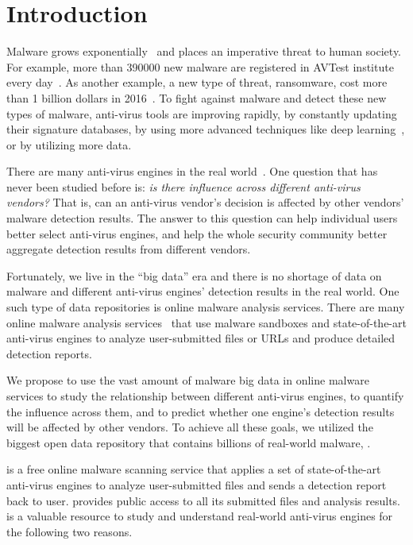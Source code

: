 \section{Introduction}
\label{sec:intro}

Malware grows exponentially~\cite{avtest} and places an imperative threat to human society. 
For example, more than 390000 new malware are registered in AVTest institute every day~\cite{avtest}.
As another example, a new type of threat, ransomware, cost more than 1 billion dollars in 2016~\cite{ransomware}. 
To fight against malware and detect these new types of malware, 
anti-virus tools are improving rapidly,
by constantly updating their signature databases, 
by using more advanced techniques like deep learning~\cite{cylance}, 
or by utilizing more data. 

There are many anti-virus engines in the real world~\cite{virustotal}.
One question that has never been studied before is: 
{\em is there influence across different anti-virus vendors?}
That is, can an anti-virus vendor's decision is affected 
by other vendors' malware detection results. 
The answer to this question can help individual users better select anti-virus engines,
and help the whole security community better aggregate detection results from different vendors. 

Fortunately, we live in the ``big data'' era and there is no shortage of data on malware and different anti-virus engines' 
detection results in the real world. 
One such type of data repositories is online malware analysis services. 
There are many online malware analysis services~\cite{virustotal,malwr,vxstream,anubis} 
that use malware sandboxes and state-of-the-art
anti-virus engines to analyze user-submitted files 
or URLs and produce detailed detection reports. 

We propose to use the vast amount of malware big data in online malware services 
to study the relationship between different anti-virus engines, 
to quantify the influence across them, 
and to predict whether one engine's detection results will be affected by other vendors. 
To achieve all these goals, we utilized the biggest open data repository
that contains billions of real-world malware, {\em \vt}.

\vt{} is a free online malware scanning service
that applies a set of state-of-the-art anti-virus engines to analyze user-submitted files 
and sends a detection report back to user.
\vt{} provides public access to all its submitted files and analysis results. 
\vt{} is a valuable resource to study and 
understand real-world anti-virus engines for the following two reasons. 

